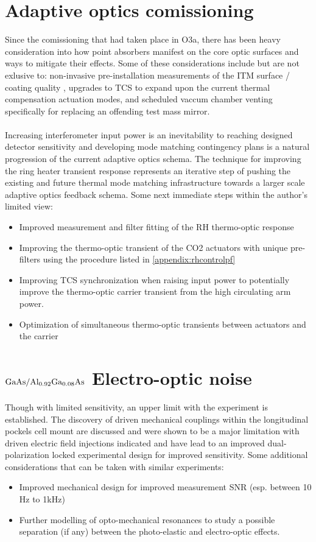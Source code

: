 
\section{Adaptive optics comissioning}
Since the comissioning that had taken place in O3a, there has been heavy consideration into how point absorbers manifest on the core optic surfaces and ways to mitigate their effects. Some of these considerations include but are not exlusive to: non-invasive pre-installation measurements of the ITM surface / coating quality \cite{dcc:paNSFupdate2022}, upgrades to TCS to expand upon the current thermal compensation actuation modes, and scheduled vaccum chamber venting specifically for replacing an offending test mass mirror. 
\\
\\
Increasing interferometer input power is an inevitability to reaching designed detector sensitivity and developing mode matching contingency plans is a natural progression of the current adaptive optics schema. The technique for improving the ring heater transient response represents an iterative step of pushing the existing and future thermal mode matching infrastructure towards a larger scale adaptive optics feedback schema. Some next immediate steps within the author's limited view:

\begin{itemize}
	\item Improved measurement and filter fitting of the RH thermo-optic response
	\item Improving the thermo-optic transient of the CO2 actuators with unique pre-filters using the procedure listed in \autoref{appendix:rhcontrolpf} 
	\item Improving TCS synchronization when raising input power to potentially improve the thermo-optic carrier transient from the high circulating arm power.
	\item Optimization of simultaneous thermo-optic transients between actuators and the carrier 
\end{itemize}

\section{\texorpdfstring{$\mathrm{GaAs} / \mathrm{Al_{0.92}Ga_{0.08}As}$}{gaas/algaas} Electro-optic noise}
Though with limited sensitivity, an upper limit with the experiment is established. The discovery of driven mechanical couplings within the longitudinal pockels cell mount are discussed and were shown to be a major limitation with driven electric field injections indicated and have lead to an improved dual-polarization locked experimental design for improved sensitivity. Some additional considerations that can be taken with similar experiments:

\begin{itemize}
	\item Improved mechanical design for improved measurement SNR (esp. between 10 Hz to 1kHz)
	\item Further modelling of opto-mechanical resonances to study a possible separation (if any) between the photo-elastic and electro-optic effects.  
\end{itemize}
